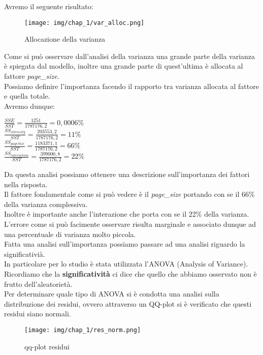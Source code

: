 Avremo il seguente risultato:
\begin{figure}[H]
    \centering
    \texttt{[image: img/chap\_1/var\_alloc.png]}
    \caption{Allocazione della varianza}
    \label{fig:var_alloc}
\end{figure}
\noindent
Come si può osservare dall'analisi della varianza una grande parte della varianza è spiegata dal modello, inoltre una grande parte di quest'ultima è allocata al fattore \textit{page\_size}.\\
Possiamo definire l'importanza facendo il rapporto tra varianza allocata al fattore e quella totale.\\
Avremo dunque:
\begin{center}
    
    $\frac{SSE}{SST} = \frac{1251}{1787176,2} = 0,0006\% $\\
    $\frac{SS_{intensity}}{SST} = \frac{203553,2}{1787176,2} = 11\%$ \\
    $\frac{SS_{pageSize}}{SST} = \frac{1183371,1}{1787176,2}=66\%$ \\
    $\frac{SS_{interaction}}{SST} = \frac{399000,8}{1787176,2}=22\% $
    
\end{center}
Da questa analisi possiamo ottenere una descrizione sull'importanza dei fattori nella risposta.\\
Il fattore fondamentale come si può vedere è il \textit{page\_size} portando con se il 66\% della varianza complessiva.\\
Inoltre è importante anche l'interazione che porta con se il 22\% della varianza.\\
L'errore come si può facimente osservare risulta marginale e associato dunque ad una percentuale di varianza molto piccola.\\
Fatta una analisi sull'importanza possiamo passare ad una analisi riguardo la significativià.\\
In particolare per lo studio è stata utilizzata l'ANOVA (Analysis of Variance).\\
Ricordiamo che la \textbf{significatività} ci dice che quello che abbiamo osservato non è frutto dell'aleatorietà.\\
Per determinare quale tipo di ANOVA si è condotta una analisi sulla distribuzione dei residui, ovvero attraverso un QQ-plot si è verificato che questi residui siano normali.\\
\begin{figure}[H]
    \centering
    \texttt{[image: img/chap\_1/res\_norm.png]}
    \caption{qq-plot residui}
    \label{fig:qq_res_plot}
\end{figure}
